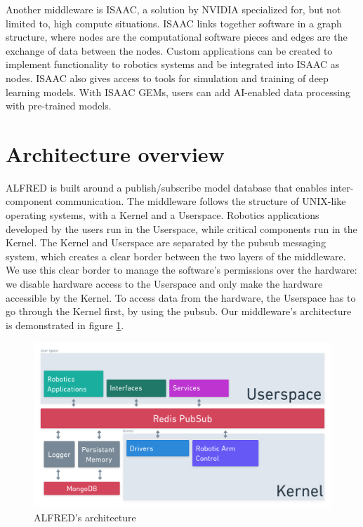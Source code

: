 Another middleware is ISAAC, a solution by NVIDIA specialized for, but not limited to, high compute situations. ISAAC links together software in a graph structure, where nodes are the computational software pieces and edges are the exchange of data between the nodes. Custom applications can be created to implement functionality to robotics systems and be integrated into ISAAC as nodes. ISAAC also gives access to tools for simulation and training of deep learning models. With ISAAC GEMs, users can add AI-enabled data processing with pre-trained models.



\section{Architecture overview}

ALFRED is built around a publish/subscribe model database that enables inter-component communication. The middleware follows the structure of UNIX-like operating systems, with a Kernel and a Userspace. Robotics applications developed by the users run in the Userspace, while critical components run in the Kernel. The Kernel and Userspace are separated by the \Gls{pubsub} messaging system, which creates a clear border between the two layers of the middleware. We use this clear border to manage the software's permissions over the hardware: we disable hardware access to the Userspace and only make the hardware accessible by the Kernel. To access data from the hardware, the Userspace has to go through the Kernel first, by using the \Gls{pubsub}. Our middleware's architecture is demonstrated in figure \ref{fig:arch_simple}.

\begin{figure}
  \centering
  \includegraphics{images/ALFRED_arch_simple.png}
  \caption{ALFRED's architecture}
  \label{fig:arch_simple}
\end{figure}

